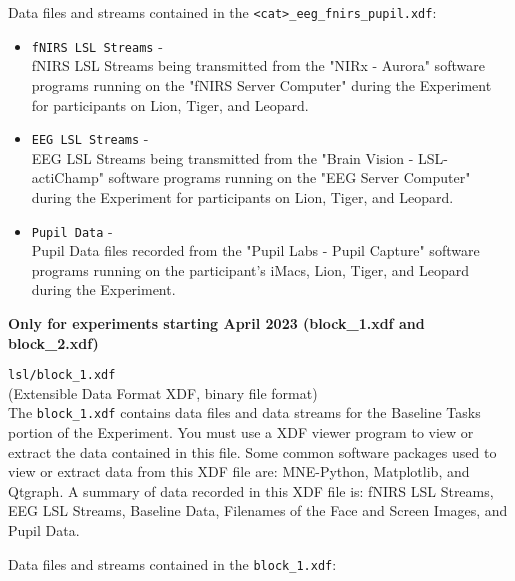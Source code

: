 \begin{description}
\begin{addmargin}[0em]{0em}
    Data files and streams contained in the \verb|<cat>_eeg_fnirs_pupil.xdf|:

    \begin{itemize}
        \item \verb|fNIRS LSL Streams| -\\
        fNIRS LSL Streams being transmitted from the "NIRx - Aurora" software
        programs running on the "fNIRS Server Computer" during the Experiment
        for participants on Lion, Tiger, and Leopard.
        \item \verb|EEG LSL Streams| -\\
        EEG LSL Streams being transmitted from the "Brain Vision -
        LSL-actiChamp" software programs running on the "EEG Server Computer"
        during the Experiment for participants on Lion, Tiger, and Leopard.
        \item \verb|Pupil Data| -\\
        Pupil Data files recorded from the "Pupil Labs - Pupil Capture"
        software programs running on the participant's iMacs, Lion, Tiger, and
        Leopard during the Experiment.
    \end{itemize}

\end{addmargin}

\bigskip
\begin{addmargin}[0em]{0em}
    \item\textbf{Only for experiments starting April 2023 (block\_1.xdf and block\_2.xdf)\\}
    \item\verb|lsl/block_1.xdf|\\
        (Extensible Data Format XDF, binary file format)\\
        The \verb|block_1.xdf| contains data files and data streams for the
        Baseline Tasks portion of the Experiment. You must use a XDF viewer
        program to view or extract the data contained in this file. Some common
        software packages used to view or extract data from this XDF file are:
        MNE-Python, Matplotlib, and Qtgraph. A summary of data recorded in this
        XDF file is: fNIRS LSL Streams, EEG LSL Streams, Baseline Data,
        Filenames of the Face and Screen Images, and Pupil Data.

        \noindent Data files and streams contained in the \verb|block_1.xdf|:


\end{addmargin}
\end{description}
